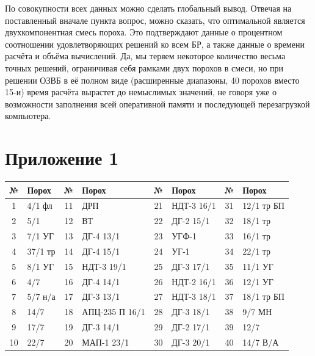 \documentclass[14pt, a4paper]{extreport} %
\begin{document}
По совокупности всех данных можно сделать глобальный вывод. Отвечая на поставленный вначале пункта вопрос, можно сказать, что оптимальной является двухкомпонентная смесь пороха. Это подтверждают данные о процентном соотношении удовлетворяющих решений ко всем БР, а также данные 
о времени расчёта и объёма вычислений. Да, мы теряем некоторое количество весьма точных решений, ограничивая себя рамками двух порохов в смеси, но при решении ОЗВБ в её полном виде (расширенные диапазоны, 40 порохов вместо 15-и) время расчёта вырастет до немыслимых значений, не говоря уже о возможности 
заполнения всей оперативной памяти и последующей перезагрузкой компьютера.

\chapter*{Приложение 1}

\begin{table}[h]
\centering
\begin{tabular}{|c|l|c|l|c|l|c|l|}
\hline
\textbf{№} & \textbf{Порох} & \textbf{№} & \textbf{Порох} & \textbf{№} & \textbf{Порох} & \textbf{№} & \textbf{Порох} \\
\hline
1 & 4/1 фл & 11 & ДРП & 21 & НДТ-3 16/1 & 31 & 12/1 тр БП \\
\hline
2 & 5/1 & 12 & ВТ & 22 & ДГ-2 15/1 & 32 & 18/1 тр \\
\hline
3 & 7/1 УГ & 13 & ДГ-4 13/1 & 23 & УГФ-1 & 33 & 16/1 тр \\
\hline
4 & 37/1 тр & 14 & ДГ-4 15/1 & 24 & УГ-1 & 34 & 22/1 тр \\
\hline
5 & 8/1 УГ & 15 & НДТ-3 19/1 & 25 & ДГ-3 17/1 & 35 & 11/1 УГ \\
\hline
6 & 4/7 & 16 & ДГ-4 14/1 & 26 & НДТ-2 16/1 & 36 & 12/1 УГ \\
\hline
7 & 5/7 н/а & 17 & ДГ-3 13/1 & 27 & НДТ-3 18/1 & 37 & 18/1 тр БП \\
\hline
8 & 14/7 & 18 & АПЦ-235 П 16/1 & 28 & ДГ-3 18/1 & 38 & 9/7 МН \\
\hline
9 & 17/7 & 19 & ДГ-3 14/1 & 29 & ДГ-2 17/1 & 39 & 12/7 \\
\hline
10 & 22/7 & 20 & МАП-1 23/1 & 30 & ДГ-3 20/1 & 40 & 14/7 В/А \\
\hline
\end{tabular}
\end{table}
\end{document}
